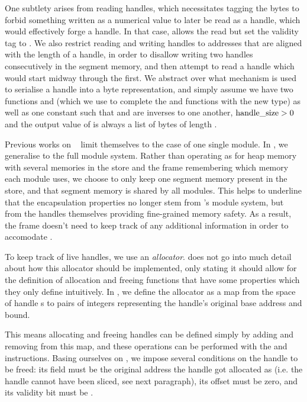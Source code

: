 \documentclass[acmsmall,screen]{acmart}\settopmatter{}
\begin{document}
One subtlety arises from reading handles, which necessitates tagging the bytes to forbid something written as a numerical value to later be read as a handle, which would effectively forge a handle. In that case, \mswasm allows the read but set the validity tag to \xxCfalse. We also restrict reading and writing handles to addresses that are aligned with the length of a handle, in order to disallow writing two handles consecutively in the segment memory, and then attempt to read a handle which would start midway through the first. We abstract over what mechanism is used to serialise a handle into a byte representation, and simply assume we have two functions \xxWserialisehandle and \xxWdeserialisehandle (which we use to complete the \xxWserialise and \xxWdeserialise functions with the new \xxWhandle type) as well as one constant \xxWhandlesize such that \xxWserialisehandle and \xxWdeserialisehandle are inverses to one another, \( \mathrm{handle\_size} > 0 \) and the output value of \xxWserialisehandle is always a list of bytes of length \xxWhandlesize.

Previous works on \mswasm~\cite{mswasm} limit themselves to the case of one single module. In \irismswasm, we generalise to the full module system. Rather than operating as for heap memory with several memories in the store and the frame remembering which memory each module uses, we choose to only keep one segment memory present in the store, and that segment memory is shared by all modules. This helps to underline that the encapsulation properties no longer stem from \wasm's module system, but from the handles themselves providing fine-grained memory safety. As a result, the frame doesn't need to keep track of any additional information in order to accomodate \mswasm.

To keep track of live handles, we use an \emph{allocator}. \citet{mswasm} does not go into much detail about how this allocator should be implemented, only stating it should allow for the definition of allocation and freeing functions that have some properties which they only define intuitively. In \irismswasm, we define the allocator as a map from the space of handle \xxWid{}s to pairs of integers representing the handle's original base address and bound.

This means allocating and freeing handles can be defined simply by adding and removing from this map, and these operations can be performed with the \xxWsegalloc and \xxWsegfree instructions. Basing ourselves on \citet{mswasm}, we impose several conditions on the handle to be freed: its  field must be the original address the handle got allocated as (i.e. the handle cannot have been sliced, see next paragraph), its offset must be zero, and its validity bit must be \xxCtrue. %
\end{document}

